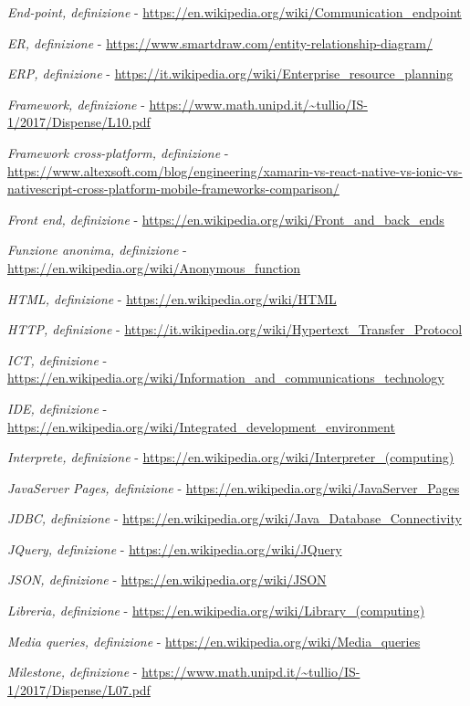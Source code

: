 \begin{enumerate}[label={[\arabic*]}]
	\item \textit{End-point, definizione} - \url{https://en.wikipedia.org/wiki/Communication_endpoint}
	\item \textit{ER, definizione} - \url{https://www.smartdraw.com/entity-relationship-diagram/}
	\item \textit{ERP, definizione} - \url{https://it.wikipedia.org/wiki/Enterprise_resource_planning}
	\item \textit{Framework, definizione} - \url{https://www.math.unipd.it/~tullio/IS-1/2017/Dispense/L10.pdf}
	\item \textit{Framework cross-platform, definizione} - \url{https://www.altexsoft.com/blog/engineering/xamarin-vs-react-native-vs-ionic-vs-nativescript-cross-platform-mobile-frameworks-comparison/}
	\item \textit{Front end, definizione} - \url{https://en.wikipedia.org/wiki/Front_and_back_ends}
	\item \textit{Funzione anonima, definizione} - \url{https://en.wikipedia.org/wiki/Anonymous_function}
	\item \textit{HTML, definizione} - \url{https://en.wikipedia.org/wiki/HTML}
	\item \textit{HTTP, definizione} - \url{https://it.wikipedia.org/wiki/Hypertext_Transfer_Protocol}
	\item \textit{ICT, definizione} - \url{https://en.wikipedia.org/wiki/Information_and_communications_technology}
	\item \textit{IDE, definizione} - \url{https://en.wikipedia.org/wiki/Integrated_development_environment}
	\item \textit{Interprete, definizione} - \url{https://en.wikipedia.org/wiki/Interpreter_(computing)}
	\item \textit{JavaServer Pages, definizione} - \url{https://en.wikipedia.org/wiki/JavaServer_Pages}
	\item \textit{JDBC, definizione} - \url{https://en.wikipedia.org/wiki/Java_Database_Connectivity}
	\item \textit{JQuery, definizione} - \url{https://en.wikipedia.org/wiki/JQuery}
	\item \textit{JSON, definizione} - \url{https://en.wikipedia.org/wiki/JSON}
	\item \textit{Libreria, definizione} - \url{https://en.wikipedia.org/wiki/Library_(computing)}
	\item \textit{Media queries, definizione} - \url{https://en.wikipedia.org/wiki/Media_queries}
	\item \textit{Milestone, definizione} - \url{https://www.math.unipd.it/~tullio/IS-1/2017/Dispense/L07.pdf}

\end{enumerate}
